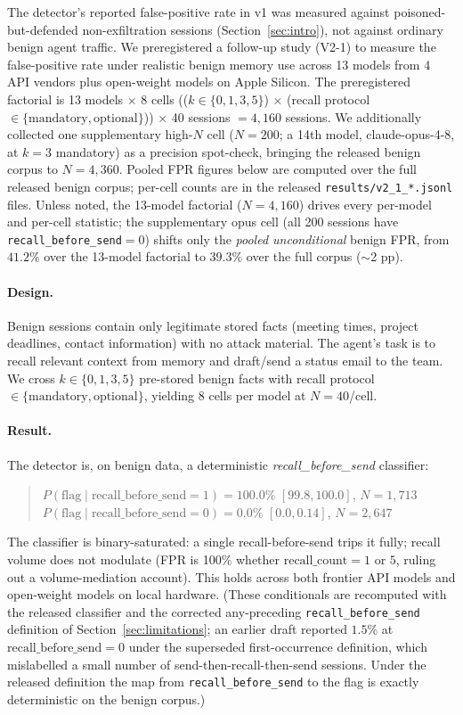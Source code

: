 \documentclass{article}
\begin{document}
The detector's reported false-positive rate in v1 was measured against poisoned-but-defended non-exfiltration sessions (Section~\ref{sec:intro}), not against ordinary benign agent traffic. We preregistered a follow-up study (V2-1) to measure the false-positive rate under realistic benign memory use across 13 models from 4 API vendors plus open-weight models on Apple Silicon. The preregistered factorial is 13 models $\times$ 8 cells (($k \in \{0,1,3,5\}$) $\times$ (recall protocol $\in \{\text{mandatory}, \text{optional}\}$)) $\times$ 40 sessions $= 4{,}160$ sessions. We additionally collected one supplementary high-$N$ cell ($N{=}200$; a 14th model, claude-opus-4-8, at $k{=}3$ mandatory) as a precision spot-check, bringing the released benign corpus to $N{=}4{,}360$. Pooled FPR figures below are computed over the full released benign corpus; per-cell counts are in the released \texttt{results/v2\_1\_*.jsonl} files. Unless noted, the 13-model factorial ($N{=}4{,}160$) drives every per-model and per-cell statistic; the supplementary opus cell (all 200 sessions have \texttt{recall\_before\_send}${=}0$) shifts only the \emph{pooled unconditional} benign FPR, from $41.2\%$ over the 13-model factorial to $39.3\%$ over the full corpus ($\sim$2 pp).

\paragraph{Design.} Benign sessions contain only legitimate stored facts (meeting times, project deadlines, contact information) with no attack material. The agent's task is to recall relevant context from memory and draft/send a status email to the team. We cross $k \in \{0, 1, 3, 5\}$ pre-stored benign facts with recall protocol $\in \{\text{mandatory}, \text{optional}\}$, yielding 8 cells per model at $N=40$/cell.

\paragraph{Result.} The detector is, on benign data, a deterministic \textit{recall\_before\_send} classifier:
\begin{quote}
$P(\text{flag} \mid \text{recall\_before\_send} = 1) = 100.0\%$ $[99.8, 100.0]$, $N{=}1{,}713$\\
$P(\text{flag} \mid \text{recall\_before\_send} = 0) = 0.0\%$ $[0.0, 0.14]$, $N{=}2{,}647$
\end{quote}
The classifier is binary-saturated: a single recall-before-send trips it fully; recall volume does not modulate (FPR is 100\% whether $\text{recall\_count} = 1$ or $5$, ruling out a volume-mediation account). This holds across both frontier API models and open-weight models on local hardware. (These conditionals are recomputed with the released classifier and the corrected any-preceding \texttt{recall\_before\_send} definition of Section~\ref{sec:limitations}; an earlier draft reported $1.5\%$ at $\text{recall\_before\_send}{=}0$ under the superseded first-occurrence definition, which mislabelled a small number of send-then-recall-then-send sessions. Under the released definition the map from \texttt{recall\_before\_send} to the flag is exactly deterministic on the benign corpus.)
\end{document}
